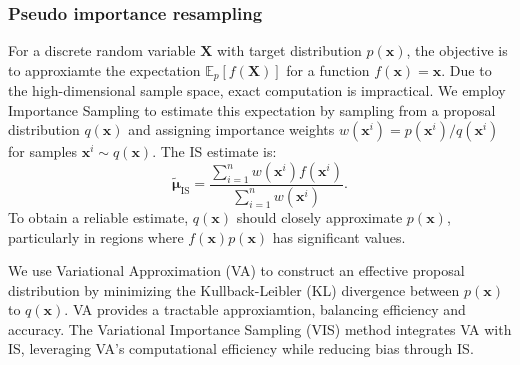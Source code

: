 \documentclass[pdflatex,sn-mathphys-num]{sn-jnl}%
\theoremstyle{thmstyleone}%
\theoremstyle{thmstyletwo}%
\theoremstyle{thmstylethree}%
\begin{document}
\subsubsection{Pseudo importance resampling}\label{subsubsec3}
For a discrete random variable $\mathbf{X}$ with target distribution $p\left(\mathbf{x}\right)$, the objective is to approxiamte the expectation $\mathbb{E}_{p}[f\left( \mathbf{X} \right)]$ for a function $f\left(\mathbf{x}\right) = \mathbf{x}$. Due to the high-dimensional sample space, exact computation is impractical. We employ Importance Sampling to estimate this expectation by sampling from a proposal distribution $q\left(\mathbf{x}\right)$ and assigning importance weights $w\left( \mathbf{x}^{i} \right) = p\left(\mathbf{x}^{i}\right)/q\left(\mathbf{x}^{i}\right)$ for samples $\mathbf{x}^i \sim q\left(\mathbf{x}\right)$. The IS estimate is:
\begin{equation}
    \tilde{\boldsymbol{\mu}}_{\operatorname{IS}} =  \frac{\sum_{i=1}^{n}w\left( \mathbf{x}^{i} \right) f\left( \mathbf{x}^{i} \right)}{\sum_{i=1}^n w\left( \mathbf{x}^{i} \right)}.
\end{equation}
To obtain a reliable estimate, $q\left(\mathbf{x}\right)$ should closely approximate $p\left(\mathbf{x}\right)$, particularly in regions where $f\left(\mathbf{x}\right)p\left(\mathbf{x}\right)$ has significant values.

We use Variational Approximation (VA) to construct an effective proposal distribution by minimizing the Kullback-Leibler (KL) divergence between $p\left(\mathbf{x}\right)$ to $q\left(\mathbf{x}\right)$. VA provides a tractable approxiamtion, balancing efficiency and accuracy. The Variational Importance Sampling (VIS) method integrates VA with IS, leveraging VA's computational efficiency while reducing bias through IS.
\end{document}
